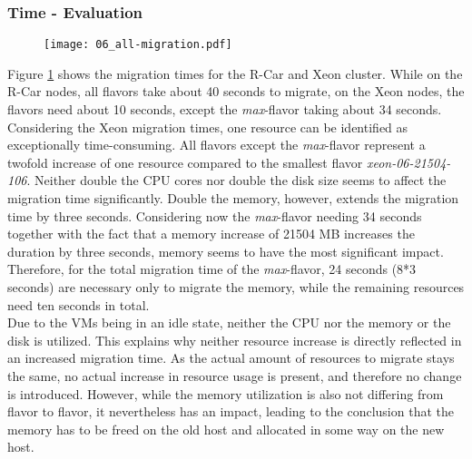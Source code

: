         \subsubsection*{Time - Evaluation}
        
            \begin{figure}[H]
              \centering
              \texttt{[image: 06\_all-migration.pdf]}
              \label{fig:vm_migration_time}
            \end{figure}
            
            \noindent Figure \ref{fig:vm_migration_time} shows the migration times for the R-Car and Xeon cluster.
            While on the R-Car nodes, all flavors take about 40 seconds to migrate, on the Xeon nodes, the flavors need about 10 seconds, except the \textsl{max}-flavor taking about 34 seconds.\\
            Considering the Xeon migration times, one resource can be identified as exceptionally time-consuming.
            All flavors except the \textsl{max}-flavor represent a twofold increase of one resource compared to the smallest flavor \textsl{xeon-06-21504-106}.
            Neither double the CPU cores nor double the disk size seems to affect the migration time significantly.
            Double the memory, however, extends the migration time by three seconds.
            Considering now the \textsl{max}-flavor needing 34 seconds together with the fact that a memory increase of 21504 MB increases the duration by three seconds, memory seems to have the most significant impact.
            Therefore, for the total migration time of the \textsl{max}-flavor, 24 seconds (8*3 seconds) are necessary only to migrate the memory, while the remaining resources need ten seconds in total.\\
            Due to the \acp{VM} being in an idle state, neither the \ac{CPU} nor the memory or the disk is utilized.
            This explains why neither resource increase is directly reflected in an increased migration time.
            As the actual amount of resources to migrate stays the same, no actual increase in resource usage is present, and therefore no change is introduced.
            However, while the memory utilization is also not differing from flavor to flavor, it nevertheless has an impact, leading to the conclusion that the memory has to be freed on the old host and allocated in some way on the new host.
            
